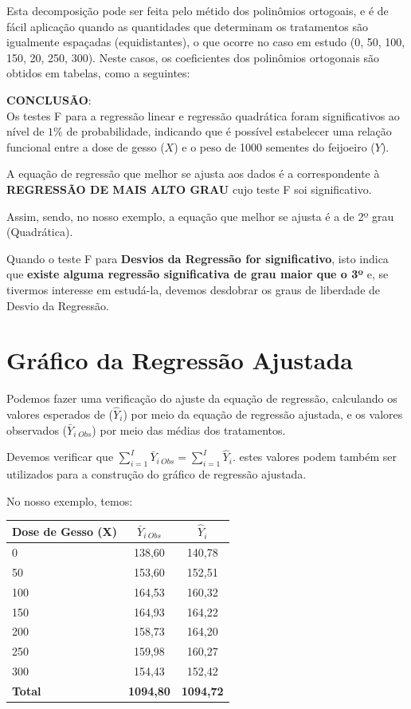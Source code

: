 \documentclass[
]{book}
\begin{document}
Esta decomposição pode ser feita pelo métido dos polinômios ortogoais, e é de fácil aplicação quando as quantidades que determinam os tratamentos são igualmente espaçadas (equidistantes), o que ocorre no caso em estudo (0, 50, 100, 150, 20, 250, 300). Neste casos, os coeficientes dos polinômios ortogonais são obtidos em tabelas, como a seguintes:

\textbf{CONCLUSÃO}:\\
Os testes F para a regressão linear e regressão quadrática foram significativos ao nível de \(1\%\) de probabilidade, indicando que é possível estabelecer uma relação funcional entre a dose de gesso (\(X\)) e o peso de 1000 sementes do feijoeiro (\(Y\)).

A equação de regressão que melhor se ajusta aos dados é a correspondente à \textbf{REGRESSÃO DE MAIS ALTO GRAU} cujo teste F soi significativo.

Assim, sendo, no nosso exemplo, a equação que melhor se ajusta é a de 2º grau (Quadrática).

Quando o teste F para \textbf{Desvios da Regressão for significativo}, isto indica que \textbf{existe alguma regressão significativa de grau maior que o 3º} e, se tivermos interesse em estudá-la, devemos desdobrar os graus de liberdade de Desvio da Regressão.

\hypertarget{gruxe1fico-da-regressuxe3o-ajustada}{%
\section{Gráfico da Regressão Ajustada}\label{gruxe1fico-da-regressuxe3o-ajustada}}

Podemos fazer uma verificação do ajuste da equação de regressão, calculando os valores esperados de (\(\hat{Y}_i\)) por meio da equação de regressão ajustada, e os valores observados (\(\bar{Y}_{i\;Obs}\)) por meio das médias dos tratamentos.

Devemos verificar que \(\sum_{i=1}^I\bar{Y}_{i~Obs}=\sum_{i=1}^I\hat{Y}_{i}\). estes valores podem também ser utilizados para a construção do gráfico de regressão ajustada.

No nosso exemplo, temos:

\begin{longtable}[]{@{}lcc@{}}
\toprule
Dose de Gesso (X) & \(\bar{Y}_{i~Obs}\) & \(\hat{Y}_i\)\tabularnewline
\midrule
\endhead
0 & 138,60 & 140,78\tabularnewline
50 & 153,60 & 152,51\tabularnewline
100 & 164,53 & 160,32\tabularnewline
150 & 164,93 & 164,22\tabularnewline
200 & 158,73 & 164,20\tabularnewline
250 & 159,98 & 160,27\tabularnewline
300 & 154,43 & 152,42\tabularnewline
\textbf{Total} & \textbf{1094,80} & \textbf{1094,72}\tabularnewline
\bottomrule
\end{longtable}
\end{document}
